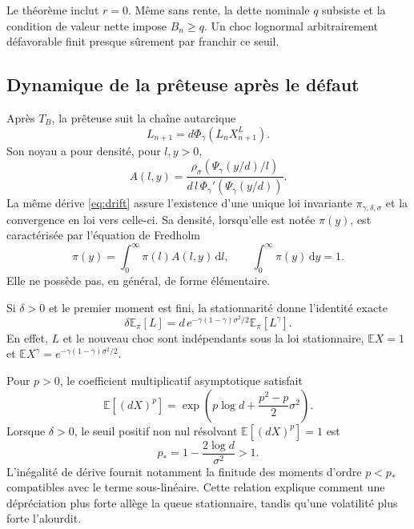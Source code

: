 \documentclass[11pt,a4paper]{article}
\newcommand{\E}{\mathbb E}
\newcommand{\1}{\mathbf 1}
\newcommand{\dd}{\,\mathrm d}
\theoremstyle{definition}
\theoremstyle{remark}
\begin{document}
Le théorème inclut $r=0$. Même sans rente, la dette nominale $q$ subsiste
et la condition de valeur nette impose $B_n\geq q$. Un choc lognormal
arbitrairement défavorable finit presque sûrement par franchir ce seuil.

\subsection{Dynamique de la prêteuse après le défaut}

Après $T_B$, la prêteuse suit la chaîne autarcique
\begin{equation}
L_{n+1}=d\Phi_\gamma(L_nX^L_{n+1}).
\label{eq:lender-autarky}
\end{equation}
Son noyau a pour densité, pour $l,y>0$,
\begin{equation}
A(l,y)=
\frac{\rho_\sigma\!\left(\Psi_\gamma(y/d)/l\right)}
{d\,l\,\Phi_\gamma'\!\left(\Psi_\gamma(y/d)\right)}.
\label{eq:autarky-kernel}
\end{equation}
La même dérive \eqref{eq:drift} assure l'existence d'une unique loi
invariante $\pi_{\gamma,\delta,\sigma}$ et la convergence en loi vers
celle-ci. Sa densité, lorsqu'elle est notée $\pi(y)$, est caractérisée par
l'équation de Fredholm
\begin{equation}
\pi(y)=\int_0^\infty \pi(l)A(l,y)\dd l,
\qquad \int_0^\infty\pi(y)\dd y=1.
\label{eq:invariant-fredholm}
\end{equation}
Elle ne possède pas, en général, de forme élémentaire.

Si $\delta>0$ et le premier moment est fini, la stationnarité donne
l'identité exacte
\begin{equation}
\delta\E_\pi[L]
=d\,e^{-\gamma(1-\gamma)\sigma^2/2}
\E_\pi[L^\gamma].
\label{eq:stationary-moment}
\end{equation}
En effet, $L$ et le nouveau choc sont indépendants sous la loi
stationnaire, $\E X=1$ et
$\E X^\gamma=e^{-\gamma(1-\gamma)\sigma^2/2}$.

Pour $p>0$, le coefficient multiplicatif asymptotique satisfait
\begin{equation}
\E[(dX)^p]
=\exp\!\left(p\log d+\frac{p^2-p}{2}\sigma^2\right).
\label{eq:moment-coefficient}
\end{equation}
Lorsque $\delta>0$, le seuil positif non nul résolvant
$\E[(dX)^p]=1$ est
\begin{equation}
p_*=1-\frac{2\log d}{\sigma^2}>1.
\label{eq:pstar}
\end{equation}
L'inégalité de dérive fournit notamment la finitude des moments d'ordre
$p<p_*$ compatibles avec le terme sous-linéaire. Cette relation explique
comment une dépréciation plus forte allège la queue stationnaire, tandis
qu'une volatilité plus forte l'alourdit.
\end{document}
